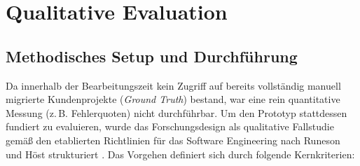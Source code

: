 \chapter{Qualitative Evaluation}
\label{sec:qualitative_evaluation}

\section{Methodisches Setup und Durchführung}
\label{subsec:methodisches_setup}

Da innerhalb der Bearbeitungszeit kein Zugriff auf bereits vollständig manuell migrierte Kundenprojekte (\textit{Ground Truth}) bestand, war eine rein quantitative Messung (z.\,B. Fehlerquoten) nicht durchführbar. Um den Prototyp stattdessen fundiert zu evaluieren, wurde das Forschungsdesign als qualitative Fallstudie gemäß den etablierten Richtlinien für das Software Engineering nach Runeson und Höst strukturiert \parencite{runesonGuidelinesConductingReporting2009}. Das Vorgehen definiert sich durch folgende Kernkriterien:

